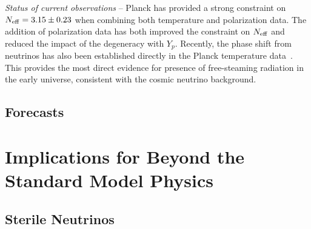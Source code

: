 {\it Status of current observations} -- Planck has provided a strong constraint on $N_{\rm eff} = 3.15 \pm 0.23$ when combining both temperature and polarization data.  The addition of polarization data has both improved the constraint on $N_{\rm eff}$ and reduced the impact of the degeneracy with $Y_p$.  Recently, the phase shift from neutrinos has also been established directly in the Planck temperature data~\cite{Follin:2015hya}.  This provides the most direct evidence for presence of free-steaming radiation in the early universe, consistent with the cosmic neutrino background.


\subsection{Forecasts}




\section{Implications for Beyond the Standard Model Physics}
\subsection{Sterile Neutrinos}
\label{sec:sterile_neutrinos}


